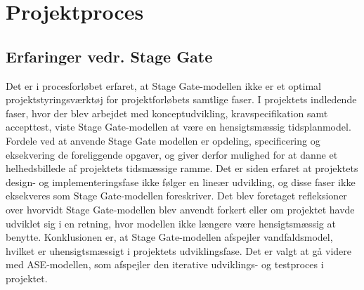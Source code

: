 \chapter{Projektproces}

\section{Erfaringer vedr. Stage Gate }

Det er i procesforløbet erfaret, at Stage Gate-modellen ikke er et optimal  projektstyringsværktøj for projektforløbets samtlige faser.
I projektets indledende faser, hvor der blev arbejdet med konceptudvikling, kravspecifikation samt accepttest, viste Stage Gate-modellen at være en hensigtsmæssig tidsplanmodel. Fordele ved at anvende Stage Gate modellen er opdeling, specificering og eksekvering de foreliggende opgaver, og giver derfor mulighed for at danne et helhedsbillede af projektets tidsmæssige ramme. Det er siden erfaret at projektets design- og implementeringsfase ikke følger en lineær udvikling, og disse faser ikke eksekveres som Stage Gate-modellen foreskriver. Det blev foretaget refleksioner over hvorvidt Stage Gate-modellen blev anvendt forkert eller om projektet havde udviklet sig i en retning, hvor modellen ikke længere være hensigtsmæssig at benytte. Konklusionen er, at Stage Gate-modellen afspejler vandfaldsmodel, hvilket er uhensigtsmæssigt i projektets udviklingsfase. Det er valgt at gå videre med ASE-modellen, som afspejler den iterative udviklings- og testproces i projektet. 


